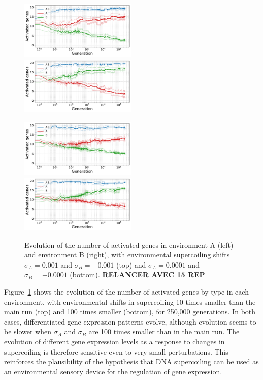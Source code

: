 \begin{figure}[H]
\centering
\includegraphics[width=0.495\textwidth]{param/sigma/sigma-1e-3/gene_activity_env_A.pdf}
\includegraphics[width=0.495\textwidth]{param/sigma/sigma-1e-3/gene_activity_env_B.pdf}

\includegraphics[width=0.495\textwidth]{param/sigma/sigma-1e-4/gene_activity_env_A.pdf}
\includegraphics[width=0.495\textwidth]{param/sigma/sigma-1e-4/gene_activity_env_B.pdf}
\caption[Evolution of the number of activated genes in each environment, with decreasing environmental supercoiling shifts]{Evolution of the number of activated genes in environment A (left) and environment B (right), with environmental supercoiling shifts $\sigma_A = 0.001$ and $\sigma_B = -0.001$ (top) and $\sigma_A = 0.0001$ and $\sigma_B = -0.0001$ (bottom). \textbf{RELANCER AVEC 15 REP}}
\label{fig:param:sigma-activity-by-env}
\end{figure}

Figure~\ref{fig:param:sigma-activity-by-env} shows the evolution of the number of activated genes by type in each environment, with environmental shifts in supercoiling 10 times smaller than the main run (top) and 100 times smaller (bottom), for 250,000 generations.
In both cases, differentiated gene expression patterns evolve, although evolution seems to be slower when $\sigma_A$ and $\sigma_B$ are 100 times smaller than in the main run.
The evolution of different gene expression levels as a response to changes in supercoiling is therefore sensitive even to very small perturbations.
This reinforces the plausibility of the hypothesis that DNA supercoiling can be used as an environmental sensory device for the regulation of gene expression.

